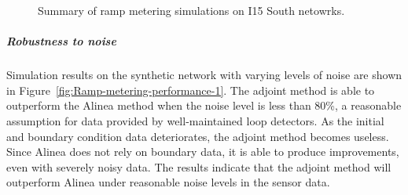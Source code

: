 								\begin{figure}
									\hfill{}
									\caption{Summary of ramp metering simulations on I15 South netowrks.}
								\end{figure}
								
								
								
								\subparagraph{Robustness to noise}
								
								Simulation results on the synthetic network with varying levels of
								noise are shown in Figure~\ref{fig:Ramp-metering-performance-1}.
								The adjoint method is able to outperform the Alinea method when the
								noise level is less than 80\%, a reasonable assumption for data provided
								by well-maintained loop detectors. As the initial and boundary condition
								data deteriorates, the adjoint method becomes useless. Since Alinea
								does not rely on boundary data, it is able to produce improvements,
								even with severely noisy data. The results indicate that the adjoint
								method will outperform Alinea under reasonable noise levels in the
								sensor data.
